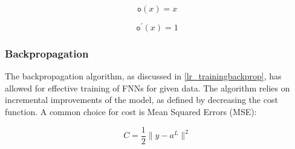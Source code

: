 \documentclass[a4paper,11pt,oneside]{article}
\theoremstyle{plain}
\theoremstyle{definition}
\begin{document}
\begin{equation}\label{func_linear}
\texttt{o}(x) = x
\end{equation}

\begin{equation}\label{func_linear_prime}
\texttt{o}^\prime(x) = 1
\end{equation}

\subsubsection{Backpropagation}\label{imp_backprop}

The backpropagation algorithm, as discussed in \ref{lr_trainingbackprop}, has allowed for effective training of FNNs for given data. The algorithm relies on incremental improvements of the model, as defined by decreasing the cost function. A common choice for cost is Mean Squared Errors (MSE):

\begin{equation}\label{func_MSE}
C = \frac{1}{2} \rVert y - a^L \rVert^2
\end{equation}
~\\
\end{document}
